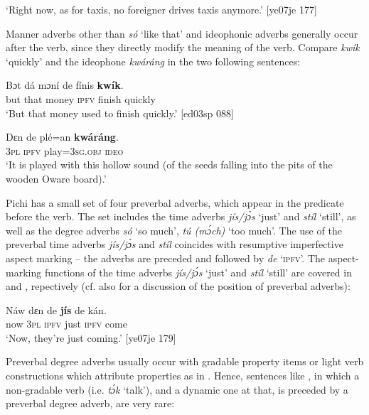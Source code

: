 \glt ‘Right now, as for taxis, no foreigner drives taxis anymore.’ [ye07je 177]
\z

Manner adverbs other than \textit{só} ‘like that’ and ideophonic adverbs generally occur after the verb, since they directly modify the meaning of the verb. Compare \textit{kwík} ‘quickly’ and the ideophone \textit{kwáráng} in the two following sentences:


\ea%
    \label{ex:key:856}
    \gll Bɔt  dá  mɔní  de  fínis    \textbf{kwík}.\\
but  that  money  \textsc{ipfv}  finish  quickly\\

\glt ‘But that money used to finish quickly.’ [ed03sp 088]
\z


\ea%
    \label{ex:key:857}
    \gll Dɛn  de  plé=an    \textbf{kwáráng}.\\
\textsc{3pl}  \textsc{ipfv}  play=\textsc{3sg.obj}  \textsc{ideo}\\

\glt ‘It is played with this hollow sound (of the seeds 
falling into the pits of the wooden Oware board).’
\z

Pichi has a small set of four preverbal adverbs, which appear in the predicate before the verb. The set includes the time adverbs\textit{ jís}\textit{\textup{/}}\textit{jɔ́s} ‘just’ and \textit{stíl} ‘still’, as well as the degree adverbs \textit{só} ‘so much’, \textit{tú (mɔ́ch)} ‘too much’. The use of the preverbal time adverbs \textit{jís}\textit{\textup{/}}\textit{jɔ́s} and \textit{stíl} coincides with resumptive imperfective aspect marking – the adverbs are preceded and followed by \textit{de} ‘\textsc{ipfv}’. The aspect-marking functions of the time adverbs \textit{jís}\textit{\textup{/}}\textit{jɔ́s} ‘just’ and \textit{stíl} ‘still’ are covered in  and , repectively (cf. also for a discussion of the position of preverbal adverbs):


\ea%
    \label{ex:key:858}
    \gll Náw    dɛn  de  \textbf{jís}  de  kán.\\
now    \textsc{3pl}  \textsc{ipfv}  just  \textsc{ipfv}  come\\

\glt ‘Now, they’re just coming.’ [ye07je 179]
\z

Preverbal degree adverbs usually occur with gradable property items or light verb constructions which attribute properties as in . Hence, sentences like , in which a non-gradable verb (i.e. \textit{tɔ́k} ‘talk’), and a dynamic one at that, is preceded by a preverbal degree adverb, are very rare: 


